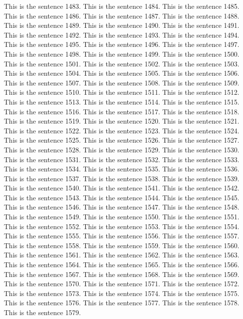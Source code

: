 \documentclass{article}
\begin{document}
This is the sentence 1483.
This is the sentence 1484.
This is the sentence 1485.
This is the sentence 1486.
This is the sentence 1487.
This is the sentence 1488.
This is the sentence 1489.
This is the sentence 1490.
This is the sentence 1491.
This is the sentence 1492.
This is the sentence 1493.
This is the sentence 1494.
This is the sentence 1495.
This is the sentence 1496.
This is the sentence 1497.
This is the sentence 1498.
This is the sentence 1499.
This is the sentence 1500.
This is the sentence 1501.
This is the sentence 1502.
This is the sentence 1503.
This is the sentence 1504.
This is the sentence 1505.
This is the sentence 1506.
This is the sentence 1507.
This is the sentence 1508.
This is the sentence 1509.
This is the sentence 1510.
This is the sentence 1511.
This is the sentence 1512.
This is the sentence 1513.
This is the sentence 1514.
This is the sentence 1515.
This is the sentence 1516.
This is the sentence 1517.
This is the sentence 1518.
This is the sentence 1519.
This is the sentence 1520.
This is the sentence 1521.
This is the sentence 1522.
This is the sentence 1523.
This is the sentence 1524.
This is the sentence 1525.
This is the sentence 1526.
This is the sentence 1527.
This is the sentence 1528.
This is the sentence 1529.
This is the sentence 1530.
This is the sentence 1531.
This is the sentence 1532.
This is the sentence 1533.
This is the sentence 1534.
This is the sentence 1535.
This is the sentence 1536.
This is the sentence 1537.
This is the sentence 1538.
This is the sentence 1539.
This is the sentence 1540.
This is the sentence 1541.
This is the sentence 1542.
This is the sentence 1543.
This is the sentence 1544.
This is the sentence 1545.
This is the sentence 1546.
This is the sentence 1547.
This is the sentence 1548.
This is the sentence 1549.
This is the sentence 1550.
This is the sentence 1551.
This is the sentence 1552.
This is the sentence 1553.
This is the sentence 1554.
This is the sentence 1555.
This is the sentence 1556.
This is the sentence 1557.
This is the sentence 1558.
This is the sentence 1559.
This is the sentence 1560.
This is the sentence 1561.
This is the sentence 1562.
This is the sentence 1563.
This is the sentence 1564.
This is the sentence 1565.
This is the sentence 1566.
This is the sentence 1567.
This is the sentence 1568.
This is the sentence 1569.
This is the sentence 1570.
This is the sentence 1571.
This is the sentence 1572.
This is the sentence 1573.
This is the sentence 1574.
This is the sentence 1575.
This is the sentence 1576.
This is the sentence 1577.
This is the sentence 1578.
This is the sentence 1579.
\end{document}
